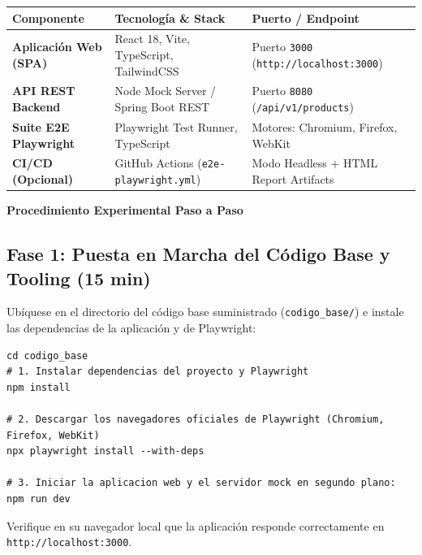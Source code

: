 \documentclass[10pt,letterpaper]{article}
\newcommand{\sectionBadge}[1]{%
  \refstepcounter{section}%
  \vspace{0.16cm}%
  \noindent%
  \colorbox{icesiBlue}{\color{white}\rule[-0.08cm]{0pt}{0.42cm}\hspace{0.16cm}\textbf{\normalsize \thesection}\hspace{0.16cm}}%
  \hspace{0.18cm}%
  {\fontsize{9.5}{12}\selectfont\textbf{\color{icesiDark}#1}}\\[-0.10cm]%
  \noindent{\color{icesiDark}\rule{\textwidth}{0.8pt}}\vspace{0.06cm}%
}
\begin{document}
\vspace{0.08cm}
\noindent
\small
\begin{tabularx}{\textwidth}{|L{2.8cm}|X|L{3.5cm}|}
\hline
{}
\textbf{Componente} & \textbf{Tecnología \& Stack} & \textbf{Puerto / Endpoint} \\ \hline
\textbf{Aplicación Web (SPA)} & React 18, Vite, TypeScript, TailwindCSS & Puerto \texttt{3000} (\texttt{http://localhost:3000}) \\ \hline
\textbf{API REST Backend} & Node Mock Server / Spring Boot REST & Puerto \texttt{8080} (\texttt{/api/v1/products}) \\ \hline
\textbf{Suite E2E Playwright} & Playwright Test Runner, TypeScript & Motores: Chromium, Firefox, WebKit \\ \hline
\textbf{CI/CD (Opcional)} & GitHub Actions (\texttt{e2e-playwright.yml}) & Modo Headless + HTML Report Artifacts \\ \hline
\end{tabularx}

\newpage

\sectionBadge{Procedimiento Experimental Paso a Paso}

\subsection{Fase 1: Puesta en Marcha del Código Base y Tooling (15 min)}
Ubíquese en el directorio del código base suministrado (\texttt{codigo\_base/}) e instale las dependencias de la aplicación y de Playwright:
\begin{lstlisting}[style=bashstyle]
cd codigo_base
# 1. Instalar dependencias del proyecto y Playwright
npm install

# 2. Descargar los navegadores oficiales de Playwright (Chromium, Firefox, WebKit)
npx playwright install --with-deps

# 3. Iniciar la aplicacion web y el servidor mock en segundo plano:
npm run dev
\end{lstlisting}
Verifique en su navegador local que la aplicación responde correctamente en \texttt{http://localhost:3000}.
\end{document}
